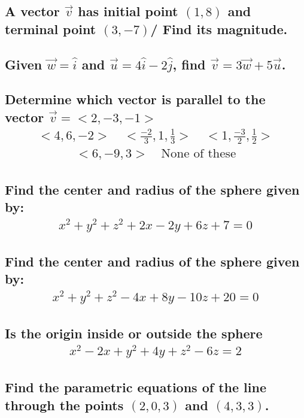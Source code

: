 \documentclass{article}
\begin{document}
\subsection{A vector $\vec{v}$ has initial point $(1, 8)$ and terminal point $(3, -7)$/ Find its magnitude.}

\subsection{Given $\vec{w} = \hat{i}$ and $\vec{u} = 4\hat{i} - 2\hat{j}$, find $\vec{v} = 3\vec{w} + 5\vec{u}$.}

\subsection{Determine which vector is parallel to the vector $\vec{v} = <2, -3, -1>$
	\begin{align*}
		<4, 6, -2> \quad <\frac{-2}{3}, 1, \frac{1}{3}> \quad <1, \frac{-3}{2}, \frac{1}{2}>
	\end{align*}
	\begin{align*}
		<6, -9, 3> \quad \text{None of these}
	\end{align*}
}

\subsection{Find the center and radius of the sphere given by:
	\begin{align*}
		x^2 + y^2 + z^2 + 2x - 2y + 6z + 7 = 0
	\end{align*}
}

\subsection{Find the center and radius of the sphere given by:
	\begin{align*}
		x^2 + y^2 + z^2 -4x + 8y - 10z + 20 = 0
	\end{align*}
}

\subsection{Is the origin inside or outside the sphere
	\begin{align*}
		x^2 - 2x + y^2 + 4y + z^2 - 6z = 2
	\end{align*}
}

\subsection{Find the parametric equations of the line through the points $(2, 0, 3)$ and $(4, 3, 3)$.}
\end{document}
